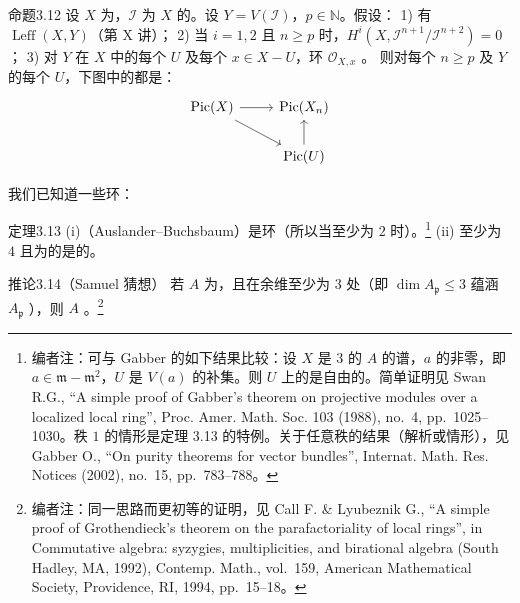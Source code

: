 \begin{SGAresult}{命题}{3.12}
设 $X$ 为，$\mathcal I$ 为 $X$ 的。设 $Y=V(\mathcal I)$，$p\in\mathbb N$。假设：
1) 有 $\operatorname{Leff}(X,Y)$（第 X 讲）；
2) 当 $i=1,2$ 且 $n\geq p$ 时，$H^i(X,\mathcal I^{n+1}/\mathcal I^{n+2})=0$；
3) 对 $Y$ 在 $X$ 中的每个 $U$ 及每个 $x\in X-U$，环 $\mathcal O_{X,x}$ 。
则对每个 $n\geq p$ 及 $Y$ 的每个 $U$，下图中的都是：
\[\begin{tikzcd}\operatorname{Pic}(X)\arrow[r]\arrow[dr]&\operatorname{Pic}(X_n)\\&\operatorname{Pic}(U)\arrow[u]\end{tikzcd}\]
\end{SGAresult}
我们已知道一些环：
\begin{SGAresult}{定理}{3.13}
(i)（Auslander--Buchsbaum）是环（所以当至少为 $2$ 时）。\footnote{编者注：可与 Gabber 的如下结果比较：设 $X$ 是 $3$ 的 $A$ 的谱，$a$ 的非零，即 $a\in\mathfrak m-\mathfrak m^2$，$U$ 是 $V(a)$ 的补集。则 $U$ 上的是自由的。简单证明见 Swan R.G., ``A simple proof of Gabber's theorem on projective modules over a localized local ring'', Proc. Amer. Math. Soc. 103 (1988), no.~4, pp.~1025--1030。秩 $1$ 的情形是定理 3.13 的特例。关于任意秩的结果（解析或情形），见 Gabber O., ``On purity theorems for vector bundles'', Internat. Math. Res. Notices (2002), no.~15, pp.~783--788。}
(ii) 至少为 $4$ 且为的是的。
\end{SGAresult}
\begin{SGAresult}{推论}{3.14（Samuel 猜想）}
若 $A$ 为，且在余维至少为 $3$ 处（即 $\dim A_{\mathfrak p}\leq3$ 蕴涵 $A_{\mathfrak p}$ ），则 $A$ 。\footnote{编者注：同一思路而更初等的证明，见 Call F. \& Lyubeznik G., ``A simple proof of Grothendieck's theorem on the parafactoriality of local rings'', in Commutative algebra: syzygies, multiplicities, and birational algebra (South Hadley, MA, 1992), Contemp. Math., vol.~159, American Mathematical Society, Providence, RI, 1994, pp.~15--18。}
\end{SGAresult}
